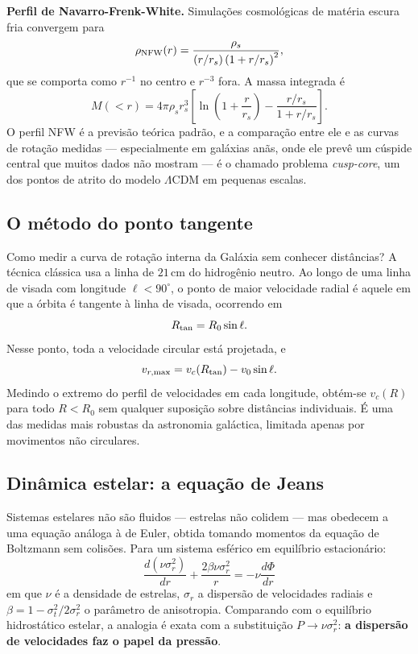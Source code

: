 \documentclass[11pt,a4paper]{article}
\begin{document}
\textbf{Perfil de Navarro-Frenk-White.} Simulações cosmológicas de matéria escura fria convergem para
\[
\rho_{\rm NFW}(r)=\frac{\rho_s}{(r/r_s)\left(1+r/r_s\right)^{2}},
\]
que se comporta como $r^{-1}$ no centro e $r^{-3}$ fora. A massa integrada é
\[
M(<r)=4\pi\rho_sr_s^{3}\left[\ln\left(1+\frac{r}{r_s}\right)-\frac{r/r_s}{1+r/r_s}\right].
\]
O perfil NFW é a previsão teórica padrão, e a comparação entre ele e as curvas de rotação medidas --- especialmente em galáxias anãs, onde ele prevê um cúspide central que muitos dados não mostram --- é o chamado problema \textit{cusp-core}, um dos pontos de atrito do modelo $\Lambda$CDM em pequenas escalas.

\subsection*{O método do ponto tangente}

Como medir a curva de rotação interna da Galáxia sem conhecer distâncias? A técnica clássica usa a linha de $21\,\mathrm{cm}$ do hidrogênio neutro. Ao longo de uma linha de visada com longitude $\ell<90^\circ$, o ponto de maior velocidade radial é aquele em que a órbita é tangente à linha de visada, ocorrendo em
\[
R_{\rm tan}=R_0\sin\ell.
\]
Nesse ponto, toda a velocidade circular está projetada, e
\[
v_{r,\max}=v_c(R_{\rm tan})-v_0\sin\ell.
\]
Medindo o extremo do perfil de velocidades em cada longitude, obtém-se $v_c(R)$ para todo $R<R_0$ sem qualquer suposição sobre distâncias individuais. É uma das medidas mais robustas da astronomia galáctica, limitada apenas por movimentos não circulares.

\subsection*{Dinâmica estelar: a equação de Jeans}

Sistemas estelares não são fluidos --- estrelas não colidem --- mas obedecem a uma equação análoga à de Euler, obtida tomando momentos da equação de Boltzmann sem colisões. Para um sistema esférico em equilíbrio estacionário:
\[
\boxed{\ \frac{d\left(\nu\sigma_r^{2}\right)}{dr}+\frac{2\beta\nu\sigma_r^{2}}{r}=-\nu\frac{d\Phi}{dr}\ }
\]
em que $\nu$ é a densidade de estrelas, $\sigma_r$ a dispersão de velocidades radiais e $\beta=1-\sigma_t^{2}/2\sigma_r^{2}$ o parâmetro de anisotropia. Comparando com o equilíbrio hidrostático estelar, a analogia é exata com a substituição $P\to\nu\sigma_r^{2}$: \textbf{a dispersão de velocidades faz o papel da pressão}.
\end{document}
